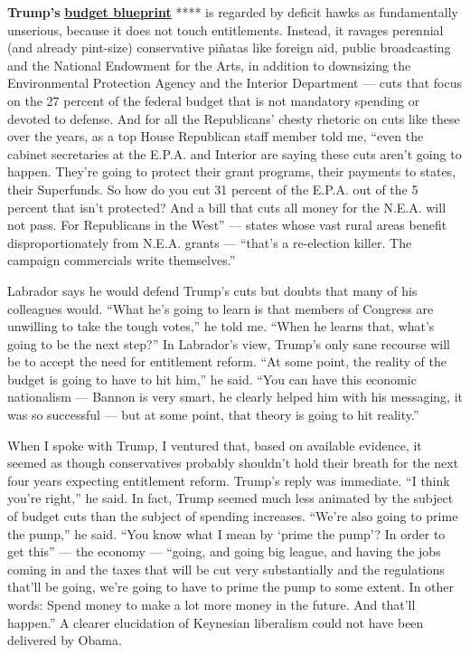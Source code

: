 \textbf{Trump's}
\href{https://www.nytimes3xbfgragh.onion/interactive/2017/03/16/us/politics/document-Trump-2018-Budget.html}{\textbf{budget
blueprint}} **** is regarded by deficit hawks as fundamentally
unserious, because it does not touch entitlements. Instead, it ravages
perennial (and already pint-size) conservative piñatas like foreign aid,
public broadcasting and the National Endowment for the Arts, in addition
to downsizing the Environmental Protection Agency and the Interior
Department --- cuts that focus on the 27 percent of the federal budget
that is not mandatory spending or devoted to defense. And for all the
Republicans' chesty rhetoric on cuts like these over the years, as a top
House Republican staff member told me, ``even the cabinet secretaries at
the E.P.A. and Interior are saying these cuts aren't going to happen.
They're going to protect their grant programs, their payments to states,
their Superfunds. So how do you cut 31 percent of the E.P.A. out of the
5 percent that isn't protected? And a bill that cuts all money for the
N.E.A. will not pass. For Republicans in the West'' --- states whose
vast rural areas benefit disproportionately from N.E.A. grants ---
``that's a re-election killer. The campaign commercials write
themselves.''

Labrador says he would defend Trump's cuts but doubts that many of his
colleagues would. ``What he's going to learn is that members of Congress
are unwilling to take the tough votes,'' he told me. ``When he learns
that, what's going to be the next step?'' In Labrador's view, Trump's
only sane recourse will be to accept the need for entitlement reform.
``At some point, the reality of the budget is going to have to hit
him,'' he said. ``You can have this economic nationalism --- Bannon is
very smart, he clearly helped him with his messaging, it was so
successful --- but at some point, that theory is going to hit reality.''

When I spoke with Trump, I ventured that, based on available evidence,
it seemed as though conservatives probably shouldn't hold their breath
for the next four years expecting entitlement reform. Trump's reply was
immediate. ``I think you're right,'' he said. In fact, Trump seemed much
less animated by the subject of budget cuts than the subject of spending
increases. ``We're also going to prime the pump,'' he said. ``You know
what I mean by `prime the pump'? In order to get this'' --- the economy
--- ``going, and going big league, and having the jobs coming in and the
taxes that will be cut very substantially and the regulations that'll be
going, we're going to have to prime the pump to some extent. In other
words: Spend money to make a lot more money in the future. And that'll
happen.'' A clearer elucidation of Keynesian liberalism could not have
been delivered by Obama.

